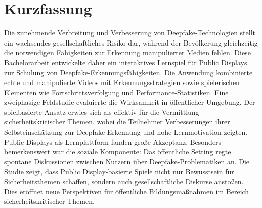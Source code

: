 \documentclass[a4paper, twoside, bibliography=totoc, headsepline, cleardoublepage=empty, parskip=half, draft=false]{scrbook}
\begin{document}


\Coverpage
\Copyright
\pagestyle{preamble}
\renewcommand*{\chapterpagestyle}{preamble}



\section*{Kurzfassung}
Die zunehmende Verbreitung und Verbesserung von Deepfake-Technologien stellt ein wachsendes gesellschaftliches Risiko dar, 
während der Bevölkerung gleichzeitig die notwendigen Fähigkeiten zur Erkennung manipulierter Medien fehlen.
Diese Bachelorarbeit entwickelte daher ein interaktives Lernspiel für Public Displays zur Schulung von Deepfake-Erkennungsfähigkeiten. 
Die Anwendung kombinierte echte und manipulierte Videos mit Erkennungsstrategien sowie spielerischen Elementen wie Fortschrittsverfolgung und Performance-Statistiken.
Eine zweiphasige Feldstudie evaluierte die Wirksamkeit in öffentlicher Umgebung. 
Der spielbasierte Ansatz erwies sich als effektiv für die Vermittlung sicherheitskritischer Themen, 
wobei die Teilnehmer Verbesserungen ihrer Selbsteinschätzung zur Deepfake Erkennung und hohe Lernmotivation zeigten. 
Public Displays als Lernplattform fanden große Akzeptanz.
Besonders bemerkenswert war die soziale Komponente: 
Das öffentliche Setting regte spontane Diskussionen zwischen Nutzern über Deepfake-Problematiken an.
Die Studie zeigt, dass Public Display-basierte Spiele nicht nur Bewusstsein für Sicherheitsthemen schaffen, sondern auch gesellschaftliche Diskurse anstoßen.
Dies eröffnet neue Perspektiven für öffentliche Bildungsmaßnahmen im Bereich sicherheitskritischer Themen.

\cleardoublepage
\end{document}
